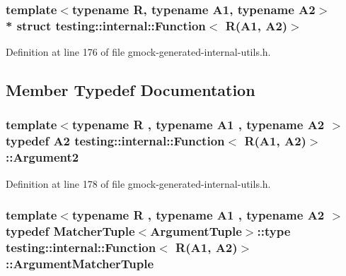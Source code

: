 \subsubsection*{template$<$typename R, typename A1, typename A2$>$\\*
struct testing\+::internal\+::\+Function$<$ R(\+A1, A2)$>$}



Definition at line 176 of file gmock-\/generated-\/internal-\/utils.\+h.



\subsection{Member Typedef Documentation}
\subsubsection[{\texorpdfstring{Argument2}{Argument2}}]{\setlength{\rightskip}{0pt plus 5cm}template$<$typename R , typename A1 , typename A2 $>$ typedef A2 {\bf testing\+::internal\+::\+Function}$<$ {\bf R}(A1, A2)$>$\+::{\bf Argument2}}\hypertarget{structtesting_1_1internal_1_1_function_3_01_r_07_a1_00_01_a2_08_4_a025f5192252366d73aa19718bb0ea89d}{}\label{structtesting_1_1internal_1_1_function_3_01_r_07_a1_00_01_a2_08_4_a025f5192252366d73aa19718bb0ea89d}


Definition at line 178 of file gmock-\/generated-\/internal-\/utils.\+h.

\subsubsection[{\texorpdfstring{Argument\+Matcher\+Tuple}{ArgumentMatcherTuple}}]{\setlength{\rightskip}{0pt plus 5cm}template$<$typename R , typename A1 , typename A2 $>$ typedef {\bf Matcher\+Tuple}$<${\bf Argument\+Tuple}$>$\+::type {\bf testing\+::internal\+::\+Function}$<$ {\bf R}(A1, A2)$>$\+::{\bf Argument\+Matcher\+Tuple}}\hypertarget{structtesting_1_1internal_1_1_function_3_01_r_07_a1_00_01_a2_08_4_ad07042129ff6370f55a279ad12f5e80f}{}\label{structtesting_1_1internal_1_1_function_3_01_r_07_a1_00_01_a2_08_4_ad07042129ff6370f55a279ad12f5e80f}


